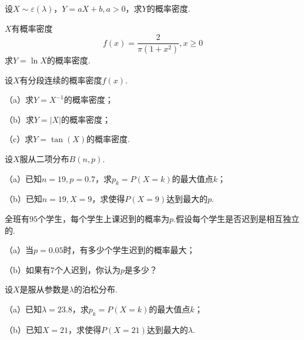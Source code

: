 \begin{exercise}[指数变量的仿射变换]\label{q:Y3.18}
设$X\sim \varepsilon(\lambda)$，$Y=aX+b,a>0$，求$Y$的概率密度.\par{}\end{exercise}

\begin{exercise}[半柯西变量的对数]\label{q:Y3.19}
$X$有概率密度
\[f(x)=\frac{2}{\pi(1+x^2)},x\geqslant 0\]
求$Y=\ln X$的概率密度.\par{}\end{exercise}

\begin{exercise}[倒数、绝对值与正切变换]\label{q:Y3.20}
设$X$有分段连续的概率密度$f(x)$.

（a）求$Y=X^{-1}$的概率密度；

（b）求$Y=|X|$的概率密度；

（c）求$Y=\tan(X)$的概率密度.\par{}\end{exercise}

\begin{exercise}[二项众数与参数估计]\label{q:Y3.21}
设$X$服从二项分布$B(n,p)$.

（a）已知$n=19,p=0.7$，求$p_k=P(X=k)$的最大值点$k$；

（b）已知$n=19,X=9$，求使得$P(X=9)$达到最大的$p$.\par{}\end{exercise}

\begin{exercise}[迟到人数的众数和估计]\label{q:Y3.22}
全班有$95$个学生，每个学生上课迟到的概率为$p$.假设每个学生是否迟到是相互独立的.

（a）当$p=0.05$时，有多少个学生迟到的概率最大；

（b）如果有$7$个人迟到，你认为$p$是多少？\par{}\end{exercise}

\begin{exercise}[泊松众数与似然]\label{q:Y3.23}
设$X$是服从参数是$\lambda$的泊松分布.

（a）已知$\lambda=23.8$，求$p_k=P(X=k)$的最大值点$k$；

（b）已知$X=21$，求使得$P(X=21)$达到最大的$\lambda$.\par{}\end{exercise}


